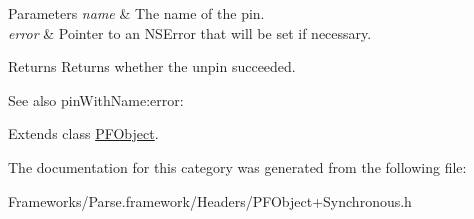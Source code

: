 \begin{DoxyParams}{Parameters}
{\em name} & The name of the pin. \\
\hline
{\em error} & Pointer to an {\ttfamily N\+S\+Error} that will be set if necessary.\\
\hline
\end{DoxyParams}
\begin{DoxyReturn}{Returns}
Returns whether the unpin succeeded.
\end{DoxyReturn}
\begin{DoxySeeAlso}{See also}
pin\+With\+Name\+:error\+: 
\end{DoxySeeAlso}


Extends class \hyperlink{interface_p_f_object_afaada7851ee75c8d64599c682415bc05}{P\+F\+Object}.



The documentation for this category was generated from the following file\+:\begin{DoxyCompactItemize}
\item 
Frameworks/\+Parse.\+framework/\+Headers/P\+F\+Object+\+Synchronous.\+h\end{DoxyCompactItemize}
